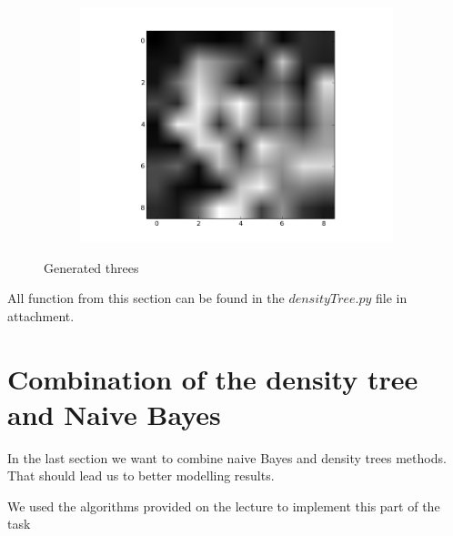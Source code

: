 \documentclass{article}
\begin{document}
\begin{figure}[ht]
\begin{subfigure}[b]{0.5\textwidth}
                \includegraphics[width=\textwidth]{../new3DTn_3.png}
        \end{subfigure}        
        \caption{Generated threes}
\end{figure}

\FloatBarrier
All function from this section can be found in the $densityTree.py$ file in attachment.


\section{Combination of the density tree and Naive Bayes}

In the last section we want to combine naive Bayes and density trees methods. That should lead us to better modelling results.

We used the algorithms provided on the lecture to implement this part of the task
\end{document}
